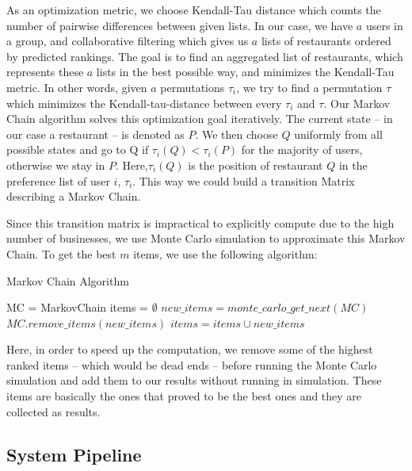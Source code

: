 \documentclass[a4paper]{article}
\begin{document}
As an optimization metric, we choose Kendall-Tau distance which counts the number of pairwise differences between given lists. In our case, we have $a$ users in a group, and collaborative filtering which gives us $a$ lists of restaurants ordered by predicted rankings. The goal is to find an aggregated list of restaurants, which represents these $a$ lists in the best possible way, and minimizes the Kendall-Tau metric. In other words, given $a$ permutations $\tau_i$, we try to find a permutation $\tau$ which minimizes the Kendall-tau-distance between every $\tau_i$ and $\tau$. Our Markov Chain algorithm solves this optimization goal iteratively. The current state -- in our case a restaurant -- is denoted as $P$. We then choose $Q$ uniformly from all possible states and go to Q if $\tau_i(Q)<\tau_i(P)$ for the majority of users, otherwise we stay in $P$. Here,$\tau_i(Q)$ is the position of restaurant $Q$ in the preference list of user $i$, $\tau_i$. This way we could build a transition Matrix describing a Markov Chain.

Since this transition matrix is impractical to explicitly compute due to the high number of businesses, we use Monte Carlo simulation to approximate this Markov Chain. To get the best $m$ items, we use the following algorithm:

\begin{algorithm}[h]
\caption{Markov Chain Algorithm}\label{alg:euclid}
MC = MarkovChain\;
items = $\emptyset$\;
 {
	$new\_items = monte\_carlo\_get\_next(MC)$\; 
    $MC.remove\_items(new\_items)$\;
    $items = items \cup new\_items$\;
}
\end{algorithm}

Here, in order to speed up the computation, we remove some of the highest ranked items -- which would be dead ends -- before running the Monte Carlo simulation and add them to our results without running in simulation. These items are basically the ones that proved to be the best ones and they are collected as results.

\subsection{System Pipeline}
\end{document}

